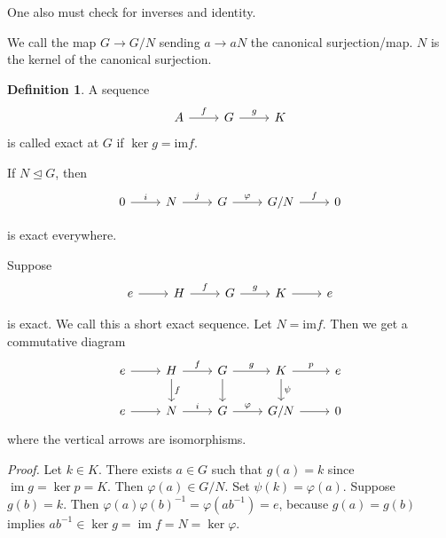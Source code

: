\documentclass[12pt, reqno]{article}
\theoremstyle{plain}
\theoremstyle{definition}
\newtheorem*{definition}{Definition}
\theoremstyle{remark}
\renewcommand{\phi}{\varphi}
\DeclareMathOperator{\ima}{\text{im}}
\begin{document}
One also must check for inverses and identity. 

We call the map $G \rightarrow G/N$ sending $a \rightarrow aN$ the canonical surjection/map. $N$ is the kernel 
of the canonical surjection. 

\begin{definition}
    A sequence 
    \begin{equation*}
        \begin{tikzcd}
            A \arrow[r, "f"] & G \arrow[r, "g"]  & K
        \end{tikzcd}
    \end{equation*}
    is called exact at $G$ if $\ker g = \text{im} f$.
\end{definition}

If $N \trianglelefteq G$, then 
\begin{equation*}
    \begin{tikzcd}
        0 \arrow[r, "i"] & N \arrow[r, "j"] & G \arrow[r, "\phi"] & G/N \arrow[r, "f"] & 0
    \end{tikzcd}
\end{equation*}

is exact everywhere.

Suppose 
\begin{equation*}
    \begin{tikzcd}
        e \arrow[r] & H \arrow[r, "f"] & G \arrow[r, "g"] & K \arrow[r] & e
    \end{tikzcd}
\end{equation*}

is exact. We call this a short exact sequence. Let $N = \text{im} f$. Then we get a commutative diagram
\begin{equation*}
    \begin{tikzcd}
        e \arrow[r] & H \arrow[r, "f"] \arrow[d, "f"] & G \arrow[r, "g"] \arrow[d] & K \arrow[r, "p"] \arrow[d,"\psi"] & e\\
        e \arrow[r] & N \arrow[r, "i"] & G \arrow[r, "\phi"] & G/N \arrow[r] & 0
    \end{tikzcd}
\end{equation*}
where the vertical arrows are isomorphisms.

\textit{Proof.} Let $k \in K$. There exists $a \in G$ such that $g(a) = k$ since $\ima g = \ker p = K$.
Then $\phi(a) \in G/N$. Set $\psi(k) = \phi(a)$. Suppose $g(b) = k$. Then $\phi(a)\phi(b)^{-1} = \phi(ab^{-1}) = e$,
because $g(a) = g(b)$ implies $ab^{-1} \in \ker g = \ima f = N = \ker \phi$.
\end{document}

